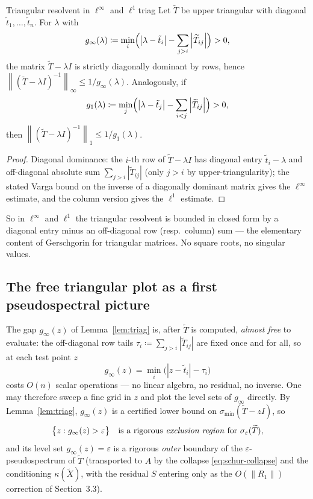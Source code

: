 \documentclass[11pt, a4paper]{article}
\numberwithin{equation}{section}
\newcommand{\norm}[1]{\left\|#1\right\|}
\newcommand{\abs}[1]{\left|#1\right|}
\newcommand{\tX}{\widetilde{X}}
\newcommand{\tT}{\widetilde{T}}
\begin{document}
\begin{lemma}{Triangular resolvent in $\ell^\infty$ and $\ell^1$}{triag}
  Let $\tT$ be upper triangular with diagonal $\tilde t_1, \ldots, \tilde t_n$.
  For $\lambda$ with
  \[
    g_\infty(\lambda) \coloneqq \min_i\Bigl(\abs{\lambda - \tilde t_i}
      - \sum_{j>i}\abs{\tT_{ij}}\Bigr) > 0,
  \]
  the matrix $\tT - \lambda I$ is strictly diagonally dominant by rows, hence
  $\norm{(\tT - \lambda I)^{-1}}_\infty \le 1/g_\infty(\lambda)$.  Analogously,
  if
  \[
    g_1(\lambda) \coloneqq \min_j\Bigl(\abs{\lambda - \tilde t_j}
      - \sum_{i<j}\abs{\tT_{ij}}\Bigr) > 0,
  \]
  then $\norm{(\tT - \lambda I)^{-1}}_1 \le 1/g_1(\lambda)$.
\end{lemma}

\begin{proof}
Diagonal dominance: the $i$-th row of $\tT - \lambda I$ has diagonal entry
$\tilde t_i - \lambda$ and off-diagonal absolute sum $\sum_{j>i}\abs{\tT_{ij}}$
(only $j > i$ by upper-triangularity); the stated Varga bound on the inverse of
a diagonally dominant matrix gives the $\ell^\infty$ estimate, and the column
version gives the $\ell^1$ estimate.
\end{proof}

So in $\ell^\infty$ and $\ell^1$ the triangular resolvent is bounded in closed
form by a diagonal entry minus an off-diagonal row (resp.\ column) sum --- the
elementary content of Gerschgorin for triangular matrices.  No square roots, no
singular values.

\subsection{The free triangular plot as a first pseudospectral picture}

The gap $g_\infty(z)$ of Lemma~\ref{lem:triag} is, after $\tT$ is computed,
\emph{almost free} to evaluate: the off-diagonal row tails $\tau_i \coloneqq
\sum_{j>i}\abs{\tT_{ij}}$ are fixed once and for all, so at each test point $z$
\[
  g_\infty(z) = \min_i\bigl(\abs{z - \tilde t_i} - \tau_i\bigr)
\]
costs $O(n)$ scalar operations --- no linear algebra, no residual, no inverse.
One may therefore sweep a fine grid in $z$ and plot the level sets of $g_\infty$
directly.  By Lemma~\ref{lem:triag}, $g_\infty(z)$ is a certified lower bound on
$\sigma_{\min}(\tT - zI)$, so
\[
  \bigl\{ z : g_\infty(z) > \varepsilon \bigr\}
  \quad\text{is a rigorous \emph{exclusion region} for }
  \sigma_\varepsilon(\tT),
\]
and its level set $g_\infty(z) = \varepsilon$ is a rigorous \emph{outer}
boundary of the $\varepsilon$-pseudospectrum of $\tT$ (transported to $A$ by the
collapse \eqref{eq:schur-collapse} and the conditioning $\kappa(\tX)$, with the
residual $S$ entering only as the $O(\norm{R_1})$ correction of
Section~3.3).
\end{document}
